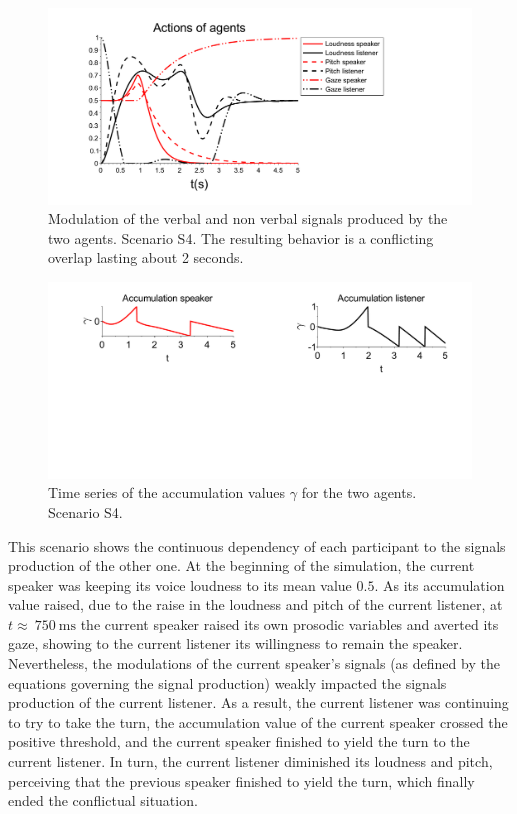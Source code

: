 \begin{figure}
  \centering
  \includegraphics[width=\linewidth]{figure/emerg_sc1.pdf}
  \caption{Modulation of the verbal and non verbal signals produced by the two agents. Scenario S4. The resulting behavior is a conflicting overlap lasting about 2 seconds.}
  \label{simu_interruption}
\end{figure}

\begin{figure}
  \centering
  \includegraphics[width=\linewidth]{figure/acc_sc1.pdf}
  \caption{Time series of the accumulation values $\gamma$ for the two agents. Scenario S4.}
  \label{inter_acc}
\end{figure}

This scenario shows the continuous dependency of each participant to the signals production of the other one. At the beginning of the simulation, the current speaker was keeping its voice loudness to its mean value $0.5$. As its accumulation value raised, due to the raise in the loudness and pitch of the current listener, at $t\approx~750~\text{ms}$ the current speaker raised its own prosodic variables and averted its gaze, showing to the current listener its willingness to remain the speaker. Nevertheless, the modulations of the current speaker's signals (as defined by the equations governing the signal production) weakly impacted the signals production of the current listener. As a result, the current listener was continuing to try to take the turn, the accumulation value of the current speaker crossed the positive threshold, and the current speaker finished to yield the turn to the current listener. In turn, the current listener diminished its loudness and pitch, perceiving that the previous speaker finished to yield the turn, which finally ended the conflictual situation.

